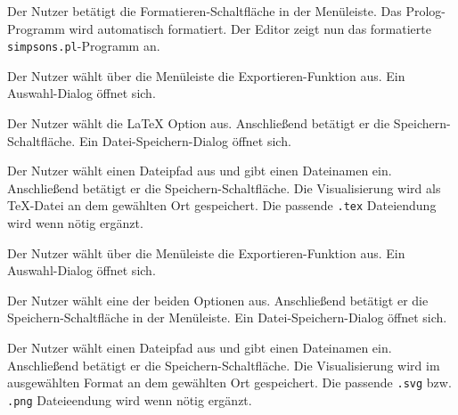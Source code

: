 \documentclass[parskip=full,11pt,twoside]{scrartcl}
\begin{document}

{Der Nutzer betätigt die Formatieren-Schaltfläche in der Menüleiste.}
{Das Prolog-Programm wird automatisch formatiert. Der Editor zeigt nun das formatierte \texttt{simpsons.pl}-Programm an.}


{Der Nutzer wählt über die Menüleiste die Exportieren-Funktion aus.}
{Ein Auswahl-Dialog öffnet sich.}

{Der Nutzer wählt die LaTeX Option aus. Anschließend betätigt er die Speichern-Schaltfläche.}
{Ein Datei-Speichern-Dialog öffnet sich.}

{Der Nutzer wählt einen Dateipfad aus und gibt einen Dateinamen ein. Anschließend betätigt er die Speichern-Schaltfläche.}
{Die Visualisierung wird als TeX-Datei an dem gewählten Ort gespeichert. Die passende \texttt{.tex} Dateiendung wird wenn nötig ergänzt.}



{Der Nutzer wählt über die Menüleiste die Exportieren-Funktion aus.}
{Ein Auswahl-Dialog öffnet sich.}

{Der Nutzer wählt eine der beiden Optionen aus. Anschließend betätigt er die Speichern-Schaltfläche in der Menüleiste.}
{Ein Datei-Speichern-Dialog öffnet sich.}

{Der Nutzer wählt einen Dateipfad aus und gibt einen Dateinamen ein. Anschließend betätigt er die Speichern-Schaltfläche.}
{Die Visualisierung wird im ausgewählten Format an dem gewählten Ort gespeichert. Die passende \texttt{.svg} bzw. \texttt{.png} Dateieendung wird wenn nötig ergänzt.}
\end{document}
